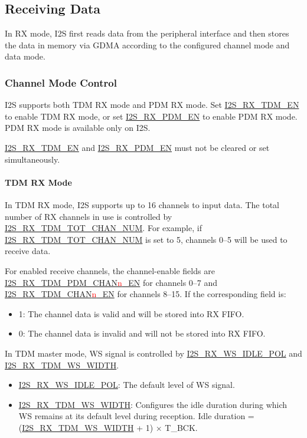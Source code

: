 \documentclass[main\_\_EN.tex]{subfiles}
\begin{document}
\subsection{Receiving Data}\label{sec:i2s-rx-data}

In RX mode, I2S first reads data from the peripheral interface and then stores the data in memory via GDMA according to the configured channel mode and data mode.

\subsubsection{Channel Mode Control}

\chipname{} I2S supports both TDM RX mode and PDM RX mode. Set \hyperref[fielddesc:I2SRXTDMEN]{I2S\_RX\_TDM\_EN} to enable TDM RX mode, or set \hyperref[fielddesc:I2SRXPDMEN]{I2S\_RX\_PDM\_EN} to enable PDM RX mode. PDM RX mode is available only on I2S.

\begin{tiplisting}
\hyperref[fielddesc:I2SRXTDMEN]{I2S\_RX\_TDM\_EN} and \hyperref[fielddesc:I2SRXPDMEN]{I2S\_RX\_PDM\_EN} must not be cleared or set simultaneously.
\end{tiplisting}
\vspace{-1em}

\paragraph{TDM RX Mode}

In TDM RX mode, I2S supports up to 16 channels to input data. The total number of RX channels in use is controlled by \hyperref[fielddesc:I2SRXTDMTOTCHANNUM]{I2S\_RX\_TDM\_TOT\_CHAN\_NUM}. For example, if \hyperref[fielddesc:I2SRXTDMTOTCHANNUM]{I2S\_RX\_TDM\_TOT\_CHAN\_NUM} is set to 5, channels 0--5 will be used to receive data.

For enabled receive channels, the channel-enable fields are \hyperref[fielddesc:I2SRXTDMPDMCHAN0EN]{I2S\_RX\_TDM\_PDM\_CHAN{\textcolor{red}{n}}\_EN} for channels 0--7 and \hyperref[fielddesc:I2SRXTDMCHAN8EN]{I2S\_RX\_TDM\_CHAN{\textcolor{red}{n}}\_EN} for channels 8--15. If the corresponding field is:
\begin{itemize}
    \item 1: The channel data is valid and will be stored into RX FIFO.
    \item 0: The channel data is invalid and will not be stored into RX FIFO.
\end{itemize}
In TDM master mode, WS signal is controlled by \hyperref[fielddesc:I2SRXWSIDLEPOL]{I2S\_RX\_WS\_IDLE\_POL} and \hyperref[fielddesc:I2SRXTDMWSWIDTH]{I2S\_RX\_TDM\_WS\_WIDTH}.
\begin{itemize}
    \item \hyperref[fielddesc:I2SRXWSIDLEPOL]{I2S\_RX\_WS\_IDLE\_POL}: The default level of WS signal.
    \item \hyperref[fielddesc:I2SRXTDMWSWIDTH]{I2S\_RX\_TDM\_WS\_WIDTH}: Configures the idle duration during which WS remains at its default level during reception. Idle duration = (\hyperref[fielddesc:I2SRXTDMWSWIDTH]{I2S\_RX\_TDM\_WS\_WIDTH} + 1) × T\_BCK.
\end{itemize}
\end{document}
